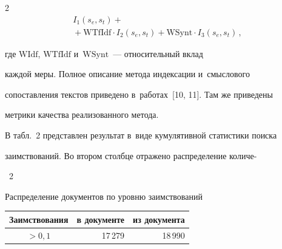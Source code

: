 \begin{multicols}{2}
\begin{multline*}
  I_1\left( s_e,s_t\right)+{}\\


  {}+\mathrm{WTfIdf}\cdot I_2\left( 


s_e,s_t\right)+\mathrm{WSynt}\cdot I_3\left( s_e, s_t\right)\,,


  \end{multline*}


    где $\mathrm{WIdf}$, $\mathrm{WTfIdf}$  и~$\mathrm{WSynt}$~--- относительный вклад 


каждой меры. Полное описание метода индексации и~смыслового 


сопоставления текстов приведено в~работах~[10, 11]. Там же приведены 


метрики качества реализованного метода.


  


  В табл.~2 представлен результат в~виде кумулятивной статистики поиска 


заимствований. Во втором столбце отражено распределение количе-\linebreak\vspace*{-12pt}





\vspace*{6pt}





\begin{center}


\noindent


\parbox{71mm}{{{\tablename~2}\ \ \small{


Распределение документов по уровню заимствований 


}}}





\vspace*{6pt}








{\small \begin{tabular}{|c|r|r|}


\hline


\multicolumn{1}{|c|}{Заимствования}&  \textbf{в} документе &  \textbf{из} документа\\


\hline


$>0{,}1$ & 17\,279\hspace*{5mm}& 18\,990\hspace*{5mm}\\



\end{tabular}}
\end{center}
\end{multicols}
